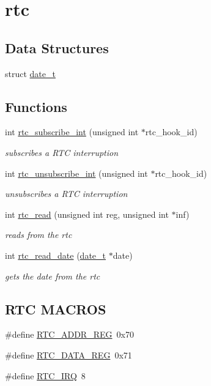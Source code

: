 \hypertarget{group__rtc}{}\section{rtc}
\label{group__rtc}
\subsection*{Data Structures}
\begin{DoxyCompactItemize}
\item 
struct \hyperlink{structdate__t}{date\+\_\+t}
\end{DoxyCompactItemize}
\subsection*{Functions}
\begin{DoxyCompactItemize}
\item 
int \hyperlink{group__rtc_ga3b9f4583bad77c33ea0e82c1c1ad5305}{rtc\+\_\+subscribe\+\_\+int} (unsigned int $\ast$rtc\+\_\+hook\+\_\+id)
\begin{DoxyCompactList}\small\item\em subscribes a R\+TC interruption \end{DoxyCompactList}\item 
int \hyperlink{group__rtc_ga61932ec1f55303bac55dea276d2a141f}{rtc\+\_\+unsubscribe\+\_\+int} (unsigned int $\ast$rtc\+\_\+hook\+\_\+id)
\begin{DoxyCompactList}\small\item\em unsubscribes a R\+TC interruption \end{DoxyCompactList}\item 
int \hyperlink{group__rtc_ga9a66dc15a321b825a97887478a95e28f}{rtc\+\_\+read} (unsigned int reg, unsigned int $\ast$inf)
\begin{DoxyCompactList}\small\item\em reads from the rtc \end{DoxyCompactList}\item 
int \hyperlink{group__rtc_ga83dbab748017bcc8531622b94cca1be1}{rtc\+\_\+read\+\_\+date} (\hyperlink{structdate__t}{date\+\_\+t} $\ast$date)
\begin{DoxyCompactList}\small\item\em gets the date from the rtc \end{DoxyCompactList}\end{DoxyCompactItemize}
\subsection*{R\+TC M\+A\+C\+R\+OS}
\begin{DoxyCompactItemize}
\item 
\#define \hyperlink{group__rtc_ga710b98232df2c563009e6f8a6cd18220}{R\+T\+C\+\_\+\+A\+D\+D\+R\+\_\+\+R\+EG}~0x70
\item 
\#define \hyperlink{group__rtc_ga2f258a00c59c3f347c8d2d4a75471ce0}{R\+T\+C\+\_\+\+D\+A\+T\+A\+\_\+\+R\+EG}~0x71
\item 
\#define \hyperlink{group__rtc_ga4e22feb6ffbc1cda32fadff5c740dc51}{R\+T\+C\+\_\+\+I\+RQ}~8
\end{DoxyCompactItemize}


